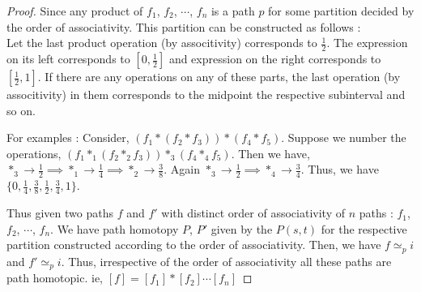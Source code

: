 \begin{proof}
	Since any product of $f_1$, $f_2$, $\cdots$, $f_n$ is a path $p$ for some partition decided by the order of associativity. This partition can be constructed as follows :\\
	Let the last product operation (by associtivity) corresponds to $\frac{1}{2}$. The expression on its left corresponds to $[0,\frac{1}{2}]$ and expression on the right corresponds to $[\frac{1}{2},1]$. If there are any operations on any of these parts, the last operation (by associtivity) in them corresponds to the midpoint the respective subinterval and so on.\\

\begin{commentary}
	For examples : Consider, $(f_1 \ast ( f_2 \ast f_3)) \ast (f_4 \ast f_5)$. Suppose we number the operations, $(f_1 \ast_1 ( f_2 \ast_2 f_3)) \ast_3 (f_4 \ast_4 f_5)$. Then we have,  $\ast_3 \to \frac{1}{2} \implies \ast_1 \to \frac{1}{4} \implies \ast_2 \to \frac{3}{8}$. Again $\ast_3 \to \frac{1}{2} \implies \ast_4 \to \frac{3}{4}$. Thus, we have $\{0, \frac{1}{4}, \frac{3}{8}, \frac{1}{2}, \frac{3}{4},1 \}$.\\
\end{commentary}
	
	Thus given two paths $f$ and $f'$ with distinct order of associativity of $n$ paths : $f_1$, $f_2$, $\cdots$, $f_n$. We have path homotopy $P$, $P'$ given by the $P(s,t)$ for the respective partition constructed according to the order of associativity. Then, we have $f \simeq_p i$ and $f' \simeq_p i$. Thus, irrespective of the order of associativity all these paths are path homotopic. ie, $[f] = [f_1] \ast [f_2] \cdots [f_n]$
\end{proof}

